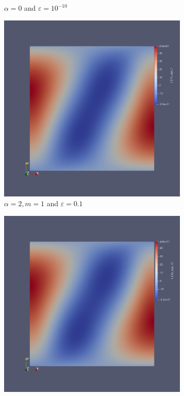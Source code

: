 \documentclass[12pt,a4paper]{article}
\begin{document}
\begin{figure}[H]
\begin{subfigure}{0.44\textwidth}
     \caption{$\alpha=0$ and $\varepsilon = 10^{-10}$}
 \end{subfigure}
 \begin{subfigure}{0.44\textwidth}
     \includegraphics[width=\textwidth]{Pics/uf/F_E1b_eps1.png}
     \caption{$\alpha=2, m=1$ and $\varepsilon = 0.1$}
 \end{subfigure}
 \begin{subfigure}{0.44\textwidth}
     \includegraphics[width=\textwidth]{Pics/uf/F_E1b_eps_10.png}

\end{subfigure}
\end{figure}
\end{document}
